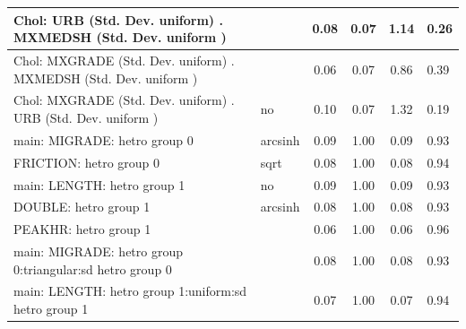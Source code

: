 \begin{table}
\begin{center}
\begin{tabular}{|l|l|c|c|c|l|}
			\hline
			 Chol: URB (Std. Dev. uniform) . MXMEDSH (Std. Dev.   uniform ) &  & 0.08 & 0.07 & 1.14 & 0.26 \\
			\hline
			 Chol: MXGRADE (Std. Dev. uniform) . MXMEDSH (Std. Dev.   uniform ) &  & 0.06 & 0.07 & 0.86 & 0.39 \\
			\hline
			 Chol: MXGRADE (Std. Dev. uniform) . URB (Std. Dev.   uniform ) & no & 0.10 & 0.07 & 1.32 & 0.19 \\
			\hline
			main: MIGRADE: hetro group 0 & arcsinh & 0.09 & 1.00 & 0.09 & 0.93 \\
			\hline
			FRICTION: hetro group 0 & sqrt & 0.08 & 1.00 & 0.08 & 0.94 \\
			\hline
			main: LENGTH: hetro group 1 & no & 0.09 & 1.00 & 0.09 & 0.93 \\
			\hline
			DOUBLE: hetro group 1 & arcsinh & 0.08 & 1.00 & 0.08 & 0.93 \\
			\hline
			PEAKHR: hetro group 1 &  & 0.06 & 1.00 & 0.06 & 0.96 \\
			\hline
			main: MIGRADE: hetro group 0:triangular:sd  hetro group 0 &  & 0.08 & 1.00 & 0.08 & 0.93 \\
			\hline
			main: LENGTH: hetro group 1:uniform:sd  hetro group 1 &  & 0.07 & 1.00 & 0.07 & 0.94 \\
			\hline
		\end{tabular}
	\end{center}
\end{table}